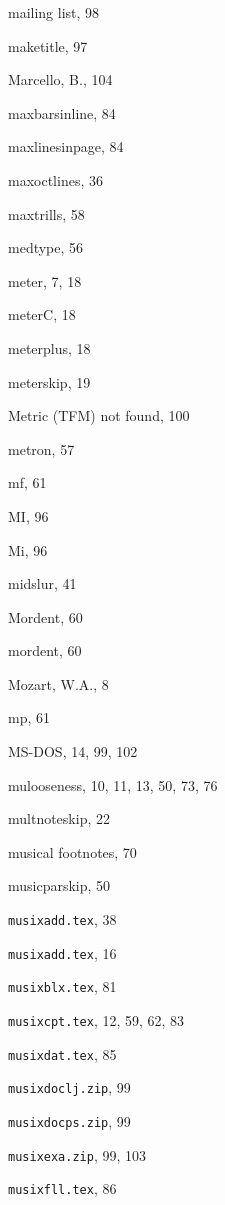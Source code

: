 \begin{theindex}
  \item mailing list, 98
  \item {\Bslash maketitle}, 97
  \item {\sc Marcello, B.}, 104
  \item {\Bslash maxbarsinline}, 84
  \item {\Bslash maxlinesinpage}, 84
  \item {\Bslash maxoctlines}, 36
  \item {\Bslash maxtrills}, 58
  \item {\Bslash medtype}, 56
  \item meter, 7, 18
  \item {\Bslash meterC}, 18
  \item {\Bslash meterplus}, 18
  \item {\Bslash meterskip}, 19
  \item Metric (TFM) not found, 100
  \item {\Bslash metron}, 57
  \item {\Bslash mf}, 61
  \item {\Bslash MI}, 96
  \item {\Bslash Mi}, 96
  \item {\Bslash midslur}, 41
  \item {\Bslash Mordent}, 60
  \item {\Bslash mordent}, 60
  \item {\sc Mozart, W.A.}, 8
  \item {\Bslash mp}, 61
  \item MS-DOS, 14, 99, 102
  \item {\Bslash mulooseness}, 10, 11, 13, 50, 73, 76
  \item {\Bslash multnoteskip}, 22
  \item musical footnotes, 70
  \item {\Bslash musicparskip}, 50
  \item {\tt  musixadd.tex}, 38
  \item {\tt musixadd.tex}, 16
  \item {\tt  musixblx.tex}, 81
  \item {\tt  musixcpt.tex}, 12, 59, 62, 83
  \item {\tt  musixdat.tex}, 85
  \item {\tt  musixdoc\underscoreSymbol lj.zip}, 99
  \item {\tt  musixdoc\underscoreSymbol ps.zip}, 99
  \item {\tt  musixexa.zip}, 99, 103
  \item {\tt  musixfll.tex}, 86

\end{theindex}
